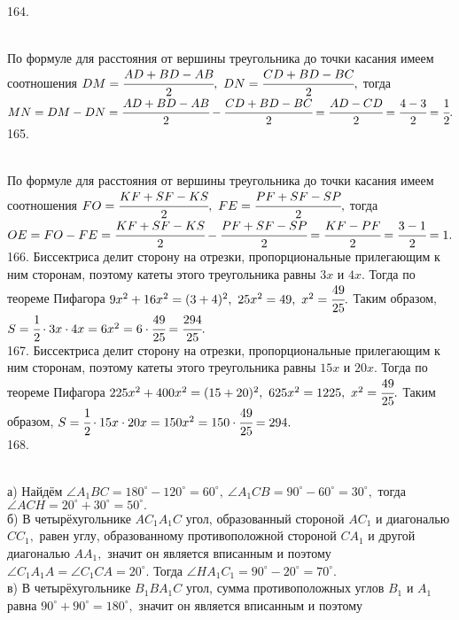 164. \begin{figure}[ht!]
\end{figure}\\
По формуле для расстояния от вершины треугольника до точки касания имеем соотношения $DM=\cfrac{AD+BD-AB}{2},\ DN=\cfrac{CD+BD-BC}{2},$ тогда\\
$MN=DM-DN=\cfrac{AD+BD-AB}{2}-\cfrac{CD+BD-BC}{2}=\cfrac{AD-CD}{2}=\cfrac{4-3}{2}=\cfrac{1}{2}.$\\
165. \begin{figure}[ht!]
\end{figure}\\
По формуле для расстояния от вершины треугольника до точки касания имеем соотношения $FO=\cfrac{KF+SF-KS}{2},\ FE=\cfrac{PF+SF-SP}{2},$ тогда\\
$OE=FO-FE=\cfrac{KF+SF-KS}{2}-\cfrac{PF+SF-SP}{2}=\cfrac{KF-PF}{2}=\cfrac{3-1}{2}=1.$\\
166. Биссектриса делит сторону на отрезки, пропорциональные прилегающим к ним сторонам, поэтому катеты этого треугольника равны $3x$ и $4x.$ Тогда по теореме Пифагора $9x^2+16x^2=(3+4)^2,\ 25x^2=49,\ x^2=\cfrac{49}{25}.$ Таким образом, $S=\cfrac{1}{2}\cdot3x\cdot4x=6x^2=6\cdot\cfrac{49}{25}=\cfrac{294}{25}.$\\
167. Биссектриса делит сторону на отрезки, пропорциональные прилегающим к ним сторонам, поэтому катеты этого треугольника равны $15x$ и $20x.$ Тогда по теореме Пифагора $225x^2+400x^2=(15+20)^2,\ 625x^2=1225,\ x^2=\cfrac{49}{25}.$ Таким образом, $S=\cfrac{1}{2}\cdot15x\cdot20x=150x^2=150\cdot\cfrac{49}{25}=294.$\\
168. \begin{figure}[ht!]
\end{figure}\\
а) Найдём $\angle A_1BC=180^\circ-120^\circ=60^\circ,\ \angle A_1CB=90^\circ-60^\circ=30^\circ,$ тогда $\angle ACH=20^\circ+30^\circ=50^\circ.$\\
б) В четырёхугольнике $AC_1A_1C$ угол, образованный стороной $AC_1$ и диагональю $CC_1,$ равен углу, образованному противоположной стороной $CA_1$ и другой диагональю $AA_1,$ значит он является вписанным и поэтому $\angle C_1A_1A=\angle C_1CA=20^\circ.$ Тогда $\angle HA_1C_1=90^\circ-20^\circ=70^\circ.$\\
в) В четырёхугольнике $B_1BA_1C$ угол, сумма противоположных углов $B_1$ и $A_1$ равна $90^\circ+90^\circ=180^\circ,$ значит он является вписанным и поэтому
